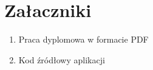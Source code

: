 \section{Załaczniki}
\begin{enumerate}[leftmargin=*]
    \item Praca dyplomowa w formacie PDF
    \item Kod źródłowy aplikacji
\end{enumerate}